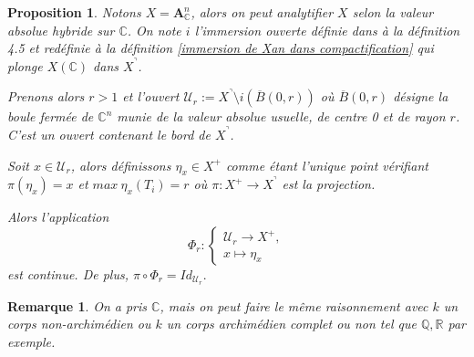 \documentclass[11pt]{article}
\newcommand{\Q}{\mathbb{Q}}
\newcommand{\R}{\mathbb{R}}
\newcommand{\C}{\mathbb{C}}
\newcommand{\ana}{\mathbf{A}}
\newtheorem{prop}[thm]{Proposition}
\newtheorem{rem}[thm]{Remarque}
\begin{document}
\begin{prop}\label{prop section continue bord}
Notons $X = \ana^n_\C$, alors on peut analytifier $X$ selon la valeur absolue hybride sur $\C$. On note $i$ l'immersion ouverte définie dans \cite{PoineauCompactificationHybride} à la définition 4.5 et redéfinie à la définition \ref{immersion de Xan dans compactification} qui plonge $X(\C)$ dans $X^\urcorner$.

Prenons alors $r >1$ et l'ouvert $\mathcal{U}_r := X^\urcorner \setminus i(\overline{B}(0,r))$ où $\overline{B}(0,r)$ désigne la boule fermée de $\C^n$ munie de la valeur absolue usuelle, de centre 0 et de rayon $r$. C'est un ouvert contenant le bord de $X^\urcorner$. 

Soit $x \in \mathcal{U}_r$, alors définissons $\eta_x \in X^+$ comme étant l'unique point vérifiant $\pi(\eta_x) = x$ et $max ~\eta_x(T_i) = r$ où $\pi : X^+ \rightarrow X^\urcorner$ est la projection.

Alors l'application
\begin{equation*}
\Phi_r : \left\{
    \begin{array}{ll}
        \mathcal{U}_r \rightarrow X^+, \\
        x \mapsto \eta_x
    \end{array}
\right.
\end{equation*} 
est continue. De plus, $\pi \circ \Phi_r = Id_{\mathcal{U}_r}.$ 
\end{prop}
\begin{rem}\label{section continue bord corps non-archi}
On a pris $\C$, mais on peut faire le même raisonnement avec $k$ un corps non-archimédien ou $k$ un corps archimédien complet ou non tel que $\Q, \R$ par exemple.
\end{rem}
\end{document}

